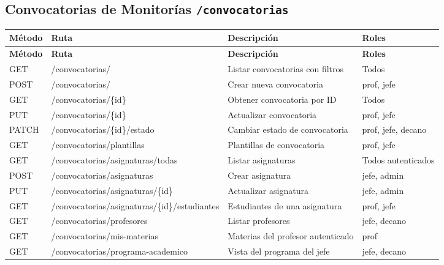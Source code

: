 \documentclass[12pt,a4paper]{article}
\begin{document}
\subsection{Convocatorias de Monitorías \texttt{/convocatorias}}
\begin{longtable}{>{\ttfamily}p{1.5cm} >{\ttfamily}p{6cm} p{4.5cm} p{2cm}}
  \toprule
  \textbf{Método} & \textbf{Ruta} & \textbf{Descripción} & \textbf{Roles} \\
  \midrule
  \endfirsthead
  \toprule \textbf{Método} & \textbf{Ruta} & \textbf{Descripción} & \textbf{Roles} \\ \midrule
  \endhead
  GET    & /convocatorias/ & Listar convocatorias con filtros & Todos \\
  POST   & /convocatorias/ & Crear nueva convocatoria & prof, jefe \\
  GET    & /convocatorias/\{id\} & Obtener convocatoria por ID & Todos \\
  PUT    & /convocatorias/\{id\} & Actualizar convocatoria & prof, jefe \\
  PATCH  & /convocatorias/\{id\}/estado & Cambiar estado de convocatoria & prof, jefe, decano \\
  GET    & /convocatorias/plantillas & Plantillas de convocatoria & prof, jefe \\
  GET    & /convocatorias/asignaturas/todas & Listar asignaturas & Todos autenticados \\
  POST   & /convocatorias/asignaturas & Crear asignatura & jefe, admin \\
  PUT    & /convocatorias/asignaturas/\{id\} & Actualizar asignatura & jefe, admin \\
  GET    & /convocatorias/asignaturas/\{id\}/estudiantes & Estudiantes de una asignatura & prof, jefe \\
  GET    & /convocatorias/profesores & Listar profesores & jefe, decano \\
  GET    & /convocatorias/mis-materias & Materias del profesor autenticado & prof \\
  GET    & /convocatorias/programa-academico & Vista del programa del jefe & jefe, decano \\
  \bottomrule
\end{longtable}

\end{document}
